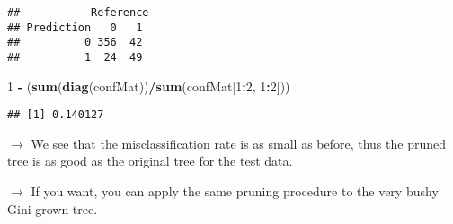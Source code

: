 \documentclass[10pt,ignorenonframetext,]{beamer}
\newenvironment{Shaded}{\begin{snugshade}}{\end{snugshade}}
\newcommand{\DataTypeTok}[1]{\textcolor[rgb]{0.13,0.29,0.53}{#1}}
\newcommand{\DecValTok}[1]{\textcolor[rgb]{0.00,0.00,0.81}{#1}}
\newcommand{\KeywordTok}[1]{\textcolor[rgb]{0.13,0.29,0.53}{\textbf{#1}}}
\newcommand{\NormalTok}[1]{#1}
\newcommand{\OperatorTok}[1]{\textcolor[rgb]{0.81,0.36,0.00}{\textbf{#1}}}
\newcommand{\StringTok}[1]{\textcolor[rgb]{0.31,0.60,0.02}{#1}}
\begin{document}
\begin{frame}[fragile]

\scriptsize

\begin{Shaded}
\end{Shaded}

\begin{verbatim}
##           Reference
## Prediction   0   1
##          0 356  42
##          1  24  49
\end{verbatim}

\begin{Shaded}
\begin{Highlighting}[]
\DecValTok{1} \OperatorTok{-}\StringTok{ }\NormalTok{(}\KeywordTok{sum}\NormalTok{(}\KeywordTok{diag}\NormalTok{(confMat))}\OperatorTok{/}\KeywordTok{sum}\NormalTok{(confMat[}\DecValTok{1}\OperatorTok{:}\DecValTok{2}\NormalTok{, }\DecValTok{1}\OperatorTok{:}\DecValTok{2}\NormalTok{]))}
\end{Highlighting}
\end{Shaded}

\begin{verbatim}
## [1] 0.140127
\end{verbatim}

\normalsize

\vspace{4mm}

\(\rightarrow\) We see that the misclassification rate is as small as
before, thus the pruned tree is as good as the original tree for the
test data.

\vspace{2mm}

\(\rightarrow\) If you want, you can apply the same pruning procedure to
the very bushy Gini-grown tree.

\end{frame}
\end{document}
